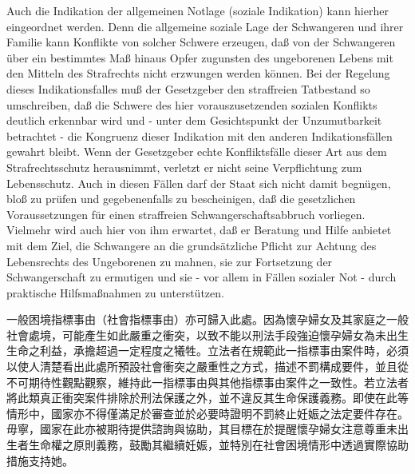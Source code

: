 \documentclass[12pt]{article}
\begin{document}
\syncleft
\begin{sourcepara}
Auch die Indikation der allgemeinen Notlage (soziale Indikation) kann hierher eingeordnet werden. Denn die allgemeine soziale Lage der Schwangeren und ihrer Familie kann Konflikte von solcher Schwere erzeugen, daß von der Schwangeren über ein bestimmtes Maß hinaus Opfer zugunsten des ungeborenen Lebens mit den Mitteln des Strafrechts nicht erzwungen werden können. Bei der Regelung dieses Indikationsfalles muß der Gesetzgeber den straffreien Tatbestand so umschreiben, daß die Schwere des hier vorauszusetzenden sozialen Konflikts deutlich erkennbar wird und - unter dem Gesichtspunkt der Unzumutbarkeit betrachtet - die Kongruenz dieser Indikation mit den anderen Indikationsfällen gewahrt bleibt. Wenn der Gesetzgeber echte Konfliktsfälle dieser Art aus dem Strafrechtsschutz herausnimmt, verletzt er nicht seine Verpflichtung zum Lebensschutz. Auch in diesen Fällen darf der Staat sich nicht damit begnügen, bloß zu prüfen und gegebenenfalls zu bescheinigen, daß die gesetzlichen Voraussetzungen für einen straffreien Schwangerschaftsabbruch vorliegen. Vielmehr wird auch hier von ihm erwartet, daß er Beratung und Hilfe anbietet mit dem Ziel, die Schwangere an die grundsätzliche Pflicht zur Achtung des Lebensrechts des Ungeborenen zu mahnen, sie zur Fortsetzung der Schwangerschaft zu ermutigen und sie - vor allem in Fällen sozialer Not - durch praktische Hilfsmaßnahmen zu unterstützen.
\end{sourcepara}
\begin{transpara}
一般困境指標事由（社會指標事由）亦可歸入此處。因為懷孕婦女及其家庭之一般社會處境，可能產生如此嚴重之衝突，以致不能以刑法手段強迫懷孕婦女為未出生生命之利益，承擔超過一定程度之犧牲。立法者在規範此一指標事由案件時，必須以使人清楚看出此處所預設社會衝突之嚴重性之方式，描述不罰構成要件，並且從不可期待性觀點觀察，維持此一指標事由與其他指標事由案件之一致性。若立法者將此類真正衝突案件排除於刑法保護之外，並不違反其生命保護義務。即使在此等情形中，國家亦不得僅滿足於審查並於必要時證明不罰終止妊娠之法定要件存在。毋寧，國家在此亦被期待提供諮詢與協助，其目標在於提醒懷孕婦女注意尊重未出生者生命權之原則義務，鼓勵其繼續妊娠，並特別在社會困境情形中透過實際協助措施支持她。
\end{transpara}
\end{document}
